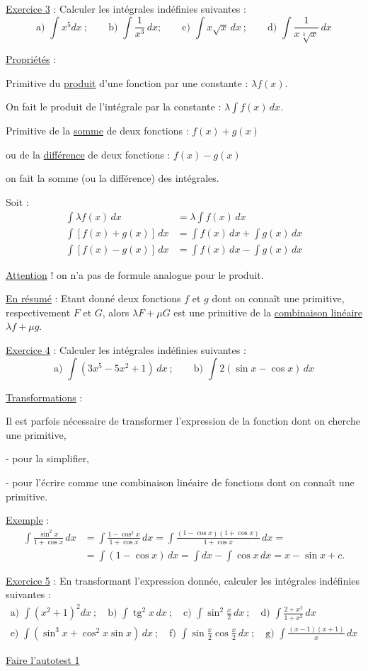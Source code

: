 \uline{Exercice 3} : Calculer les intégrales indéfinies suivantes :
\[
\text{a) }\int x^5 dx\ ;\qquad
\text{b) }\int\frac1{x^3}\,dx;\qquad
\text{c) }\int x\sqrt{x}\,dx\ ;\qquad
\text{d) }\int\frac1{x\sqrt[3]{x}}\,dx
\]

\uline{Propriétés} :

Primitive du \uline{produit} d'une fonction par une constante : $\lambda f(x)$.

On fait le produit de l'intégrale par la constante : $\lambda\int f(x)\,dx$.

Primitive de la \uline{somme} de deux fonctions : $f(x)+g(x)$

ou de la \uline{différence} de deux fonctions : $f(x)-g(x)$

on fait la somme (ou la différence) des intégrales.

Soit :
\[
\begin{aligned}
\int\lambda f(x)\,dx&=\lambda\int f(x)\,dx\\
\int[f(x)+g(x)]\,dx&=\int f(x)\,dx+\int g(x)\,dx\\
\int[f(x)-g(x)]\,dx&=\int f(x)\,dx-\int g(x)\,dx
\end{aligned}
\]

\uline{Attention} ! on n'a pas de formule analogue pour le produit.

\uline{En résumé} : Etant donné deux fonctions $f$ et $g$ dont on connaît une primitive, respectivement $F$ et $G$, alors $\lambda F+\mu G$ est une primitive de la \uline{combinaison linéaire} $\lambda f+\mu g$.

\uline{Exercice 4} : Calculer les intégrales indéfinies suivantes :
\[
\text{a) }\int(3x^5-5x^2+1)\,dx\ ;\qquad
\text{b) }\int2(\sin x-\cos x)\,dx
\]

\uline{Transformations} :

Il est parfois nécessaire de transformer l'expression de la fonction dont on cherche une primitive,

- pour la simplifier,

- pour l'écrire comme une combinaison linéaire de fonctions dont on connaît une primitive.

\uline{Exemple} :
\[
\begin{aligned}
\int\frac{\sin^2x}{1+\cos x}\,dx
&=\int\frac{1-\cos^2x}{1+\cos x}\,dx
=\int\frac{(1-\cos x)(1+\cos x)}{1+\cos x}\,dx=\\
&=\int(1-\cos x)\,dx
=\int dx-\int\cos x\,dx=x-\sin x+c.
\end{aligned}
\]

\uline{Exercice 5} : En transformant l'expression donnée, calculer les intégrales indéfinies suivantes :
\[
\begin{gathered}
\text{a) }\int(x^2+1)^2dx\ ;\quad
\text{b) }\int\operatorname{tg}^2x\,dx\ ;\quad
\text{c) }\int\sin^2\frac x2\,dx\ ;\quad
\text{d) }\int\frac{2+x^2}{1+x^2}\,dx\\
\text{e) }\int(\sin^3x+\cos^2x\sin x)\,dx\ ;\quad
\text{f) }\int\sin\frac x2\cos\frac x2\,dx\ ;\quad
\text{g) }\int\frac{(x-1)(x+1)}x\,dx
\end{gathered}
\]

\uline{Faire l'autotest 1}
